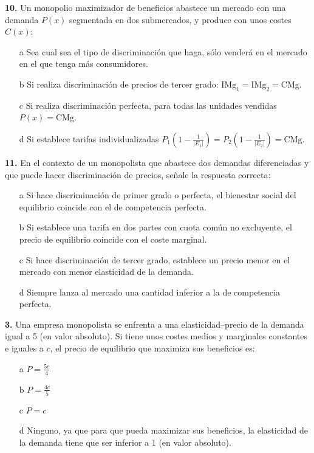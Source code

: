 \documentclass{nuevotema}
\begin{document}

\textbf{10.} Un monopolio maximizador de beneficios abastece un mercado con una demanda $P(x)$ segmentada en dos submercados, y produce con unos costes $C(x)$:
\begin{enumerate}
	\item[a] Sea cual sea el tipo de discriminación que haga, sólo venderá en el mercado en el que tenga más consumidores.
	\item[b] Si realiza discriminación de precios de tercer grado: $\text{IMg}_1 = \text{IMg}_2 = \text{CMg}$.
	\item[c] Si realiza discriminación perfecta, para todas las unidades vendidas $P(x) = \text{CMg}$.
	\item[d] Si establece tarifas individualizadas $P_1\left( 1-\frac{1}{|E_1|} \right) = P_2 \left( 1 - \frac{1}{|E_2|} \right) = \text{CMg}$.
\end{enumerate}


\textbf{11.} En el contexto de un monopolista que abastece dos demandas diferenciadas y que puede hacer discriminación de precios, señale la respuesta correcta:
\begin{enumerate}
	\item[a] Si hace discriminación de primer grado o perfecta, el bienestar social del equilibrio coincide con el de competencia perfecta.
	\item[b] Si establece una tarifa en dos partes con cuota común no excluyente, el precio de equilibrio coincide con el coste marginal.
	\item[c] Si hace discriminación de tercer grado, establece un precio menor en el mercado con menor elasticidad de la demanda.
	\item[d] Siempre lanza al mercado una cantidad inferior a la de competencia perfecta.
\end{enumerate}

\textbf{3.} Una empresa monopolista se enfrenta a una elasticidad--precio de la demanda igual a 5 (en valor absoluto). Si tiene unos costes medios y marginales constantes e iguales a $c$, el precio de equilibrio que maximiza sus beneficios es:
\begin{enumerate}
	\item[a] $P=\frac{5c}{4}$
	\item[b] $P=\frac{4c}{5}$
	\item[c] $P=c$
	\item[d] Ninguno, ya que para que pueda maximizar sus beneficios, la elasticidad de la demanda tiene que ser inferior a 1 (en valor absoluto).
\end{enumerate}
\end{document}
